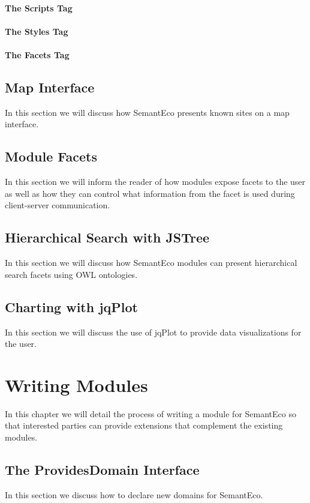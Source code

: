 \documentclass[letterpaper]{report}
\begin{document}
\subsubsection{The Scripts Tag}

\subsubsection{The Styles Tag}

\subsubsection{The Facets Tag}


\section{Map Interface}
\label{maps}
In this section we will discuss how SemantEco presents known sites on a map interface.
\section{Module Facets}
\label{facets}
In this section we will inform the reader of how modules expose facets to the user as well as how they can control what information from the facet is used during client-server communication.
\section{Hierarchical Search with JSTree}
\label{hierarchical-search}
In this section we will discuss how SemantEco modules can present hierarchical search facets using OWL ontologies.
\section{Charting with jqPlot}
\label{visualization}
In this section we will discuss the use of jqPlot to provide data visualizations for the user.
\chapter{Writing Modules}
\label{writing-modules}
In this chapter we will detail the process of writing a module for SemantEco so that interested parties can provide extensions that complement the existing modules.
\section{The ProvidesDomain Interface}
In this section we discuss how to declare new domains for SemantEco.
\end{document}
